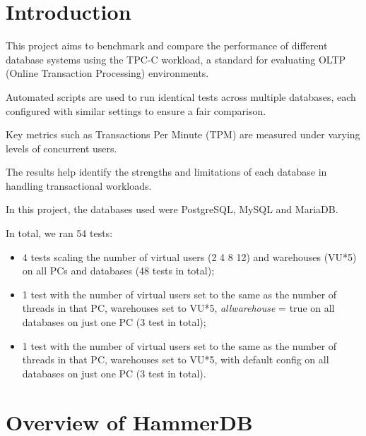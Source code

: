 
\section{Introduction}
\label{sec:intro}

This project aims to benchmark and compare the performance of different database systems using the TPC-C workload, a standard for evaluating OLTP (Online Transaction Processing) environments.

Automated scripts are used to run identical tests across multiple databases, each configured with similar settings to ensure a fair comparison.

Key metrics such as Transactions Per Minute (TPM) are measured under varying levels of concurrent users.

The results help identify the strengths and limitations of each database in handling transactional workloads.

In this project, the databases used were PostgreSQL, MySQL and MariaDB.

In total, we ran 54 tests:

\begin{itemize}
    \setlength\itemsep{0.1em}
    \item 4 tests scaling the number of virtual users (2 4 8 12) and warehouses (VU*5) on all PCs and databases (48 tests in total);
    \item 1 test with the number of virtual users set to the same as the number of threads in that PC, warehouses set to VU*5, \emph{allwarehouse} = true on all databases on just one PC (3 test in total);
    \item 1 test with the number of virtual users set to the same as the number of threads in that PC, warehouses set to VU*5, with default config on all databases on just one PC (3 test in total).
\end{itemize}

\section{Overview of HammerDB}
\label{sec:hammerdb}

